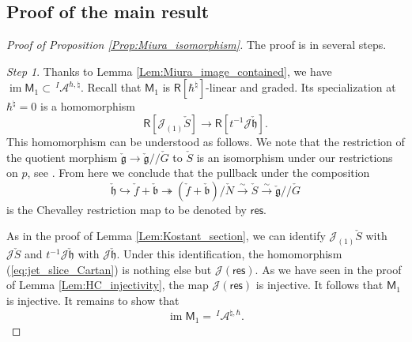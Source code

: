 \documentclass{amsart}
\theoremstyle{definition}
\newcommand{\Ring}{\mathsf{R}}
\newcommand{\g}{\mathfrak{g}}
\newcommand{\h}{\mathfrak{h}}
\newcommand{\A}{\mathscr{A}}
\newcommand{\Jet}{\mathscr{J}}
\numberwithin{equation}{section}
\begin{document}
\subsection{Proof of the main result}\label{SS_Miura_main}
\begin{proof}[Proof of Proposition \ref{Prop:Miura_isomorphism}]
The proof is in several steps. 

{\it Step 1}. Thanks to Lemma \ref{Lem:Miura_image_contained}, we have $\operatorname{im}\mathsf{M}_1\subset \,^I\!\A^{\hbar,\natural}$. 
Recall that $\mathsf{M}_1$ is $\Ring[\hbar^\natural]$-linear and graded. Its specialization at $\hbar^\natural=0$ is a homomorphism 
\begin{equation}\label{eq:jet_slice_Cartan}
\Ring[\Jet_{(1)}\check{S}]\rightarrow \Ring[t^{-1}\Jet\check{\h}].
\end{equation}
This homomorphism can be understood as follows. We note that the restriction of the quotient morphism $\check{\g}\rightarrow \check{\g}/\!/\check{G}$ to
$\check{S}$ is an isomorphism under our restrictions on $p$, see \cite[Theorem 3.2.2]{Riche_Kostant}. From here we conclude that the pullback 
under the composition 
$$\check{\h}\hookrightarrow \check{f}+\check{\mathfrak{b}}\twoheadrightarrow 
(\check{f}+\check{\mathfrak{b}})/\check{N}\xrightarrow{\sim} \check{S}\xrightarrow{\sim} \check{\g}/\!/\check{G}$$
is the Chevalley restriction map to be denoted by $\mathsf{res}$.

As in the proof of Lemma \ref{Lem:Kostant_section}, we can identify 
$\Jet_{(1)}\check{S}$ with $\Jet\check{S}$ and $t^{-1}\Jet\check{\h}$ with 
$\Jet\check{\h}$.
Under this identification, the homomorphism (\ref{eq:jet_slice_Cartan}) is nothing else but $\Jet(\mathsf{res})$. As we have seen in the proof of Lemma 
\ref{Lem:HC_injectivity}, the map $\Jet(\mathsf{res})$ is injective. 
It follows that $\mathsf{M}_1$ is injective. It remains to show that 
\begin{equation}\label{eq:image_coincidence}
\operatorname{im}\mathsf{M}_1=\,^I\!\A^{\natural,\hbar}. 
\end{equation}


\end{proof}
\end{document}

